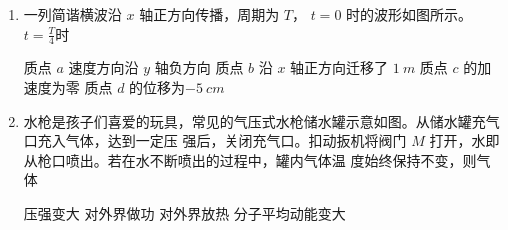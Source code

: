 \begin{enumerate}



\item
一列简谐横波沿 $ x $ 轴正方向传播，周期为 $ T $， $ t=0 $ 时的波形如图所示。 $ t=\frac{T}{4} $时  
\begin{figure}[h!]
\centering

\end{figure}

\fourchoices
{质点 $ a $ 速度方向沿 $ y $ 轴负方向}
{质点 $ b $ 沿 $ x $ 轴正方向迁移了 $ 1 \ m $}
{质点 $ c $ 的加速度为零}
{质点 $ d $ 的位移为$ -5 \ cm $}





\item
水枪是孩子们喜爱的玩具，常见的气压式水枪储水罐示意如图。从储水罐充气口充入气体，达到一定压
强后，关闭充气口。扣动扳机将阀门 $ M $ 打开，水即从枪口喷出。若在水不断喷出的过程中，罐内气体温
度始终保持不变，则气体  
\begin{figure}[h!]
\centering

\end{figure}


\fourchoices
{压强变大}
{对外界做功}
{对外界放热}
{分子平均动能变大}









\end{enumerate}
